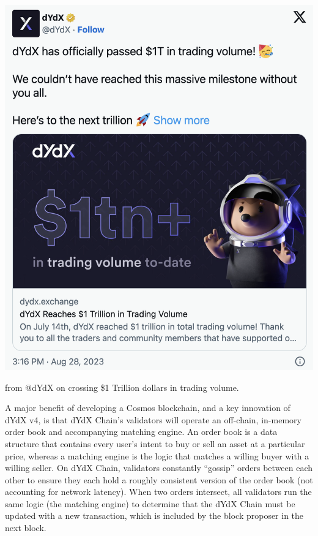         \begin{marginfigure}
            \centering
            \includegraphics[width=\linewidth]{figs/trading_vol_tweet.png}
            \caption{  from @dYdX on crossing \$1 Trillion dollars in trading volume.}
            \label{fig:trading_vol_tweet}
        \end{marginfigure}
        
        A major benefit of developing a Cosmos blockchain, and a key innovation of dYdX v4, is that dYdX Chain's validators will operate an off-chain, in-memory order book and accompanying matching engine. An order book is a data structure that contains every user's intent to buy or sell an asset at a particular price, whereas a matching engine is the logic that matches a willing buyer with a willing seller. On dYdX Chain, validators constantly ``gossip'' orders between each other to ensure they each hold a roughly consistent version of the order book (not accounting for network latency). When two orders intersect, all validators run the same logic (the matching engine) to determine that the dYdX Chain must be updated with a new transaction, which is included by the block proposer in the next block.
        
